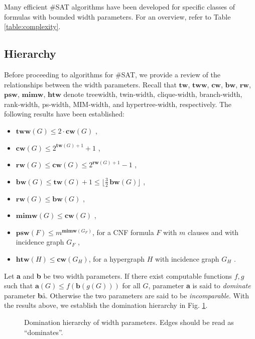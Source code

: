 Many efficient \#SAT algorithms have been developed for specific classes of formulas with bounded width parameters.
For an overview, refer to Table \ref{table:complexity}.

\subsection{Hierarchy}

Before proceeding to algorithms for \#SAT, we provide a review of the relationships between the width parameters.
Recall that $\mathbf{tw}$, $\mathbf{tww}$, $\mathbf{cw}$, $\mathbf{bw}$, $\mathbf{rw}$, $\mathbf{psw}$, $\mathbf{mimw}$, $\mathbf{htw}$ denote treewidth, twin-width, clique-width, branch-width, rank-width, ps-width, MIM-width, and hypertree-width, respectively.
The following results have been established:
\begin{itemize}[--]
	\item $\mathbf{tww}(G) \leq 2\cdot \mathbf{cw}(G)$ \cite{DBLP:conf/sat/GanianPSSS22},
	\item $\mathbf{cw}(G) \leq 2^{\mathbf{tw}(G)+1}+1$ \cite{DBLP:journals/dam/FischerMR08},
	\item $\mathbf{rw}(G) \leq \mathbf{cw}(G) \leq 2^{\mathbf{rw}(G)+1}-1$ \cite{DBLP:journals/fuin/GanianHO13},
	\item $\mathbf{bw}(G) \leq \mathbf{tw}(G) + 1 \leq \lfloor \frac{3}{2} \, \mathbf{bw}(G) \rfloor$ \cite{DBLP:journals/jct/RobertsonS91},
	\item $\mathbf{rw}(G) \leq \mathbf{bw}(G)$ \cite{DBLP:journals/fuin/GanianHO13},
	\item $\mathbf{mimw}(G) \leq \mathbf{cw}(G)$ \cite{DBLP:conf/sat/SaetherTV14},
	\item $\mathbf{psw}(F) \leq m^{\textbf{mimw}(G_F)}$, for a CNF formula $F$ with $m$ clauses and with incidence graph $G_F$ \cite{DBLP:conf/sat/SaetherTV14},
	\item $\mathbf{htw}(H) \leq \mathbf{cw}(G_H)$, for a hypergraph $H$ with incidence graph $G_H$ \cite{DBLP:journals/siamcomp/GottlobP04}.
\end{itemize}

\noindent
Let \textbf{a} and \textbf{b} be two width parameters.
If there exist computable functions $f,g$ such that $\mathbf{a}(G) \leq f(\mathbf{b}(g(G)))$ for all $G$, parameter \textbf{a} is said to {\em dominate} parameter \textbf{b}å.
Otherwise the two parameters are said to be {\em incomparable}.
With the results above, we establish the domination hierarchy in Fig. \ref{fig:hierarchy}.

\begin{figure}
	\centering
	
	\caption{Domination hierarchy of width parameters. Edges should be read as ``dominates''.}
	\label{fig:hierarchy}
\end{figure}
